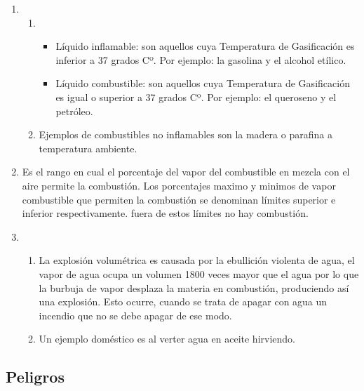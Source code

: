 \begin{enumerate}
\begin{enumerate}
  \end{enumerate}
  \item %
  \begin{enumerate}
      \item 
      \begin{itemize}
      \item Líquido inflamable: son aquellos cuya Temperatura de Gasificación es inferior a 37 grados Cº. Por ejemplo: la gasolina y el alcohol etílico.
      \item Líquido combustible: son aquellos cuya Temperatura de Gasificación es igual o superior a 37 grados Cº. Por ejemplo: el queroseno y el petróleo.
      \end{itemize}
      \item Ejemplos de combustibles no inflamables son la madera o  parafina a temperatura ambiente.
  \end{enumerate}
  \item Es el rango en cual el porcentaje del vapor del combustible en mezcla con el aire permite la combustión. Los porcentajes maximo y minimos de vapor combustible que permiten la combustión se denominan límites superior e inferior respectivamente. fuera de estos límites no hay combustión.
  \item %
  \begin{enumerate}
      \item La explosión volumétrica es causada por la ebullición violenta de agua, el vapor de agua ocupa un volumen 1800 veces mayor que el agua por lo que la burbuja de vapor desplaza la materia en combustión, produciendo así una explosión. Esto ocurre, cuando se trata de apagar con agua un incendio que no se debe apagar de ese modo.
      \item Un ejemplo doméstico es al verter agua en aceite hirviendo.
  \end{enumerate}
  \end{enumerate}
\subsection{Peligros}

